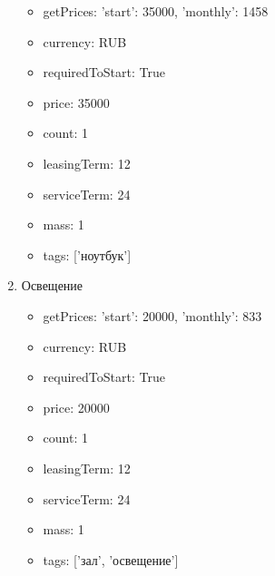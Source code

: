 \documentclass[a4paper,12pt]{article}
\begin{document}
\begin{enumerate}
\begin{itemize}
          \item getPrices: {'start': 35000, 'monthly': 1458}
        
          \item currency: RUB
        
          \item requiredToStart: True
        
          \item price: 35000
        
          \item count: 1
        
          \item leasingTerm: 12
        
          \item serviceTerm: 24
        
          \item mass: 1
        
          \item tags: ['ноутбук']
        
        \end{itemize}
      
      \item Освещение
        \begin{itemize}
        
          \item getPrices: {'start': 20000, 'monthly': 833}
        
          \item currency: RUB
        
          \item requiredToStart: True
        
          \item price: 20000
        
          \item count: 1
        
          \item leasingTerm: 12
        
          \item serviceTerm: 24
        
          \item mass: 1
        
          \item tags: ['зал', 'освещение']
        
        \end{itemize}
      

\end{enumerate}
\end{document}
